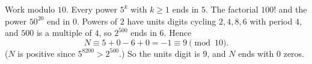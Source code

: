 Work modulo $10$. Every power $5^k$ with $k\ge1$ ends in $5$. The factorial $100!$ and the power $50^{20}$ end in $0$. Powers of $2$ have units digits cycling $2,4,8,6$ with period $4$, and $500$ is a multiple of $4$, so $2^{500}$ ends in $6$. Hence
\[
N\equiv5+0-6+0=-1\equiv9\pmod{10}.
\]
($N$ is positive since $5^{8200}>2^{500}$.) So the units digit is $9$, and $N$ ends with $\boxed{0}$ zeros.
